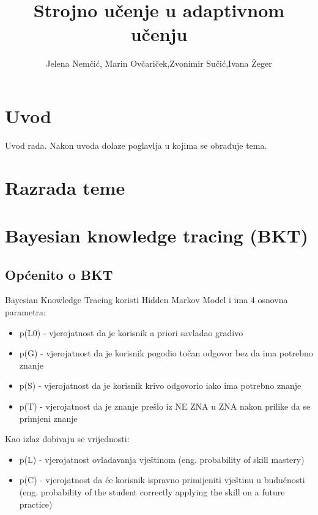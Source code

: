 \documentclass[times, utf8,projekt]{fer}
\begin{document}

\title{Strojno učenje u adaptivnom učenju}

\author{Jelena Nemčić, Marin Ovčariček,Zvonimir Sučić,Ivana Žeger}

\maketitle

\tableofcontents
\chapter{Uvod}
Uvod rada. Nakon uvoda dolaze poglavlja u kojima se obrađuje tema.

\chapter{Razrada teme}
\chapter{Bayesian knowledge tracing (BKT)}
\section{Općenito o BKT}
Bayesian Knowledge Tracing koristi Hidden Markov Model i ima 4 osnovna parametra:
\begin{itemize}
	\item p(L0) - vjerojatnost da je korisnik a priori savladao gradivo
	\item p(G) - vjerojatnost da je korisnik pogodio točan odgovor bez da ima potrebno znanje	
	\item p(S) - vjerojatnost da je korisnik krivo odgovorio iako ima potrebno znanje	
	\item p(T) - vjerojatnost da je znanje prešlo iz NE ZNA u ZNA nakon prilike da se primjeni znanje
\end{itemize}
Kao izlaz dobivaju se vrijednosti:
\begin{itemize}
	\item p(L) - vjerojatnost ovladavanja vještinom (eng. probability of skill mastery)
	\item p(C) - vjerojatnost da će korisnik ispravno primijeniti vještinu u budućnosti (eng. probability of the student correctly applying the skill on a future practice)\newline
\end{itemize}
\end{document}
